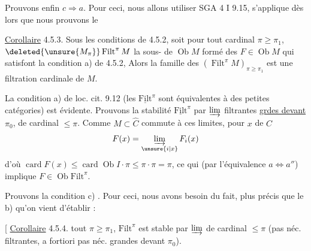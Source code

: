 Prouvons enfin $c\Rightarrow a$. Pour ceci, nous allons utiliser  SGA 4 I 9.15,  s'applique dès lors que nous prouvons le

\uline{Corollaire} 4.5.3. Sous les conditions de 4.5.2, soit \deleted{\unsure{,}} pour tout cardinal $\pi\geq\pi_1$, $\deleted{\unsure{M_\pi}}\operatorname{Filt}^{\pi}M$ la sous-\uline{}  de $\operatorname{Ob} M$ formé des $F\in\operatorname{Ob}M$  qui satisfont la condition a) de 4.5.2, Alors la famille des $(\operatorname{Filt}^{\pi}M)_{\pi\geq\pi_1}$ est une
filtration cardinale de $M$.

La condition a) de loc. cit. 9.12 (les $\underline{\mathrm{Filt}}^\pi$ sont équivalentes à des petites catégories) est évidente. Prouvons  la stabilité  $\underline{\mathrm{Filt}}^\pi$ par $\varinjlim$ filtrantes  \uline{grdes devant $\pi_0$}, de cardinal $\leq\pi$.
Comme $M\subset \widehat C$  commute à ces limites,  pour $x$ de $C$
\[ F(x)=\varinjlim_{\unsure{i|x}} F_i(x) \]
d'où $\operatorname{card}F(x)\leq\operatorname{card}\operatorname{Ob} I\cdot\pi\leq\pi\cdot\pi=\pi$, ce qui (par l'équivalence $a\Longleftrightarrow a''$) implique $F\in\operatorname{Ob}\mathrm{Filt}^\pi$.

Prouvons la condition c) . Pour ceci, nous avons besoin du fait,  plus précis que le b) qu'on vient d'établir :

[ \uline{Corollaire} 4.5.4.   tout $\pi\geq\pi_1$, $\mathrm{Filt}^\pi$  est stable par $\varinjlim$ de cardinal $\leq\pi$ (pas néc. filtrantes, a fortiori pas néc. grandes devant $\pi_0$).


